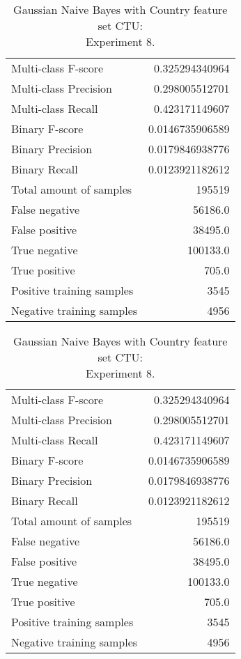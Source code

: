 \begin{table}[H]
\begin{minipage}{0.5\textwidth}
\caption{Gaussian Naive Bayes with Country feature set CTU: \\Experiment 7.}
\centering
\begin{tabular}{l r}
\toprule
Multi-class F-score & 0.325294340964 \\
Multi-class Precision & 0.298005512701 \\
Multi-class Recall & 0.423171149607 \\
\midrule
Binary F-score & 0.0146735906589 \\
Binary Precision & 0.0179846938776 \\
Binary Recall & 0.0123921182612 \\
\midrule
Total amount of samples & 195519 \\
False negative & 56186.0 \\
False positive & 38495.0 \\
True negative & 100133.0 \\
True positive & 705.0 \\
\midrule
Positive training samples & 3545 \\
Negative training samples & 4956 \\
\bottomrule
\end{tabular}
\end{minipage}
\hfillx
\begin{minipage}{0.5\textwidth}
\caption{Gaussian Naive Bayes with Country feature set CTU: \\Experiment 8.}
\centering
\begin{tabular}{l r}
\toprule
Multi-class F-score & 0.325294340964 \\
Multi-class Precision & 0.298005512701 \\
Multi-class Recall & 0.423171149607 \\
\midrule
Binary F-score & 0.0146735906589 \\
Binary Precision & 0.0179846938776 \\
Binary Recall & 0.0123921182612 \\
\midrule
Total amount of samples & 195519 \\
False negative & 56186.0 \\
False positive & 38495.0 \\
True negative & 100133.0 \\
True positive & 705.0 \\
\midrule
Positive training samples & 3545 \\
Negative training samples & 4956 \\
\bottomrule
\end{tabular}
\end{minipage}
\end{table}
